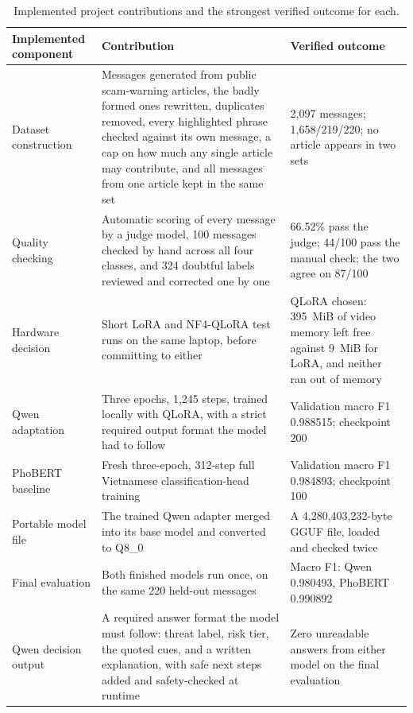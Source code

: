 \begin{table}[H]
\centering
\small
\renewcommand{\arraystretch}{1.22}
\begin{tabular}{L{3.1cm}L{6.2cm}L{4.7cm}}
\toprule
\textbf{Implemented component} & \textbf{Contribution} & \textbf{Verified outcome} \\
\midrule
Dataset construction & Messages generated from public scam-warning articles, the badly formed ones rewritten, duplicates removed, every highlighted phrase checked against its own message, a cap on how much any single article may contribute, and all messages from one article kept in the same set & 2{,}097 messages; 1{,}658/219/220; no article appears in two sets \\
Quality checking & Automatic scoring of every message by a judge model, 100 messages checked by hand across all four classes, and 324 doubtful labels reviewed and corrected one by one & 66.52\% pass the judge; 44/100 pass the manual check; the two agree on 87/100 \\
Hardware decision & Short LoRA and NF4-QLoRA test runs on the same laptop, before committing to either & QLoRA chosen: 395~MiB of video memory left free against 9~MiB for LoRA, and neither ran out of memory \\
Qwen adaptation & Three epochs, 1{,}245 steps, trained locally with QLoRA, with a strict required output format the model had to follow & Validation macro F1 0.988515; checkpoint 200 \\
PhoBERT baseline & Fresh three-epoch, 312-step full Vietnamese classification-head training & Validation macro F1 0.984893; checkpoint 100 \\
Portable model file & The trained Qwen adapter merged into its base model and converted to Q8\_0 & A 4{,}280{,}403{,}232-byte GGUF file, loaded and checked twice \\
Final evaluation & Both finished models run once, on the same 220 held-out messages & Macro F1: Qwen 0.980493, PhoBERT 0.990892 \\
Qwen decision output & A required answer format the model must follow: threat label, risk tier, the quoted cues, and a written explanation, with safe next steps added and safety-checked at runtime & Zero unreadable answers from either model on the final evaluation \\
\bottomrule
\end{tabular}
\caption{Implemented project contributions and the strongest verified outcome for each.}
\label{tab:milestone-summary}
\end{table}
